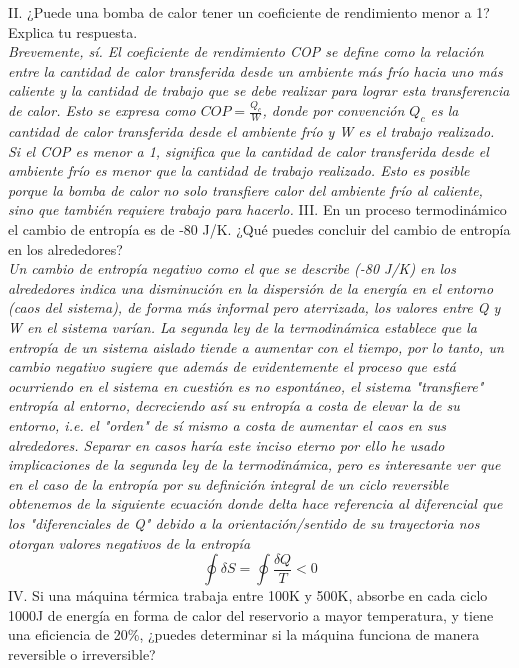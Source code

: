 \documentclass{article}
\begin{document}
II. ¿Puede una bomba de calor tener un coeficiente de rendimiento menor a 1? Explica tu respuesta. \\
\textit{Brevemente, sí. El coeficiente de rendimiento COP se define como la relación entre la cantidad de calor transferida desde un ambiente más frío hacia uno más caliente y la cantidad de trabajo que se debe realizar para lograr esta transferencia de calor. Esto se expresa como $COP = \frac{Q_c}{W}$, donde por convención $Q_c$ es la cantidad de calor transferida desde el ambiente frío y W es el trabajo realizado.} \\

\textit{Si el COP es menor a 1, significa que la cantidad de calor transferida desde el ambiente frío es menor que la cantidad de trabajo realizado. Esto es posible porque la bomba de calor no solo transfiere calor del ambiente frío al caliente, sino que también requiere trabajo para hacerlo.} 
\newpage
III. En un proceso termodinámico el cambio de entropía es de -80 J/K. ¿Qué puedes concluir del cambio de entropía en los alrededores? \\
\textit{Un cambio de entropía negativo como el que se describe (-80 J/K) en los alrededores indica una disminución en la dispersión de la energía en el entorno (caos del sistema), de forma más informal pero aterrizada, los valores entre Q y W en el sistema varían. La segunda ley de la termodinámica establece que la entropía de un sistema aislado tiende a aumentar con el tiempo, por lo tanto, un cambio negativo sugiere que además de evidentemente el proceso que está ocurriendo en el sistema en cuestión es no espontáneo, el sistema "transfiere" entropía al entorno, decreciendo así su entropía a costa de elevar la de su entorno, i.e. el "orden" de sí mismo a costa de aumentar el caos en sus alrededores. Separar en casos haría este inciso eterno por ello he usado implicaciones de la segunda ley de la termodinámica, pero es interesante ver que en el caso de la entropía por su definición integral de un ciclo reversible obtenemos de la siguiente ecuación donde delta hace referencia al diferencial que los "diferenciales de Q" debido a la orientación/sentido de su trayectoria nos otorgan valores negativos de la entropía}  \\
\begin{equation}
    \oint \delta S = \oint \frac{\delta Q}{T} < 0
\end{equation}
IV. Si una máquina térmica trabaja entre 100K y 500K, absorbe en cada ciclo 1000J de energía en forma de calor del reservorio a mayor temperatura, y tiene una eficiencia de 20\%, ¿puedes determinar si la máquina funciona de manera reversible o irreversible? \\
\end{document}
